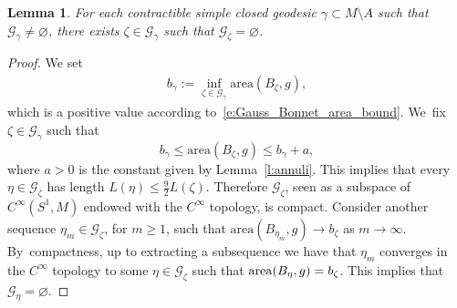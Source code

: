 \documentclass[11pt]{article}
\newcommand{\GG}{\mathcal{G}}
\newcommand{\area}{\mathrm{area}}
\theoremstyle{plain}
\newtheorem{Lemma}[Thm]{Lemma}
\theoremstyle{definition}
\begin{document}
\begin{Lemma}\label{l:innermost}
For each contractible simple closed geodesic $\gamma\subset M\setminus A$ such that $\GG_\gamma\neq\varnothing$, there exists $\zeta\in\GG_\gamma$ such that $\GG_\zeta=\varnothing$.
\end{Lemma}

\begin{proof}
We set
\begin{align*}
b_\gamma:=\inf_{\zeta\in\GG_\gamma} \area(B_\zeta,g),
\end{align*}
which is a positive value according to~\eqref{e:Gauss_Bonnet_area_bound}. We~fix $\zeta\in\GG_\gamma$ such that
\[
b_\gamma \leq\area(B_{\zeta},g)\leq b_\gamma +a,
\]
where $a>0$ is the constant given by Lemma~\ref{l:annuli}. This implies that every $\eta\in\GG_{\zeta}$ has length $L(\eta)\leq\tfrac92 L(\zeta)$. Therefore $\GG_{\zeta}$, seen as a subspace of $C^\infty(S^1,M)$ endowed with the $C^\infty$ topology, is compact. Consider another sequence $\eta_m\!\in\!\GG_{\zeta}$, for $m\!\geq\!1$, such that $\area(B_{\eta_m},g)\to b_{\zeta}$ as $m\to\infty$. By~compactness, up to extracting a subsequence we have that $\eta_m$ converges in the $C^\infty$ topology to some $\eta\in\GG_{\zeta}$ such that $\area(B_\eta,g)=\nobreak b_{\zeta}$. This implies that $\GG_\eta=\varnothing$.
\end{proof}
\end{document}
